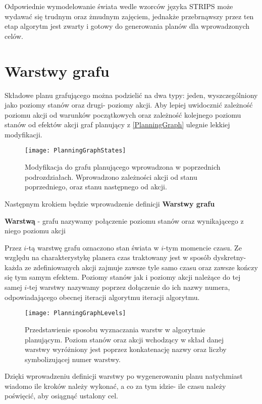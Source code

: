     
    Odpowiednie wymodelowanie świata wedle wzorców języka STRIPS może wydawać się trudnym oraz żmudnym zajęciem, jednakże przebrnąwszy 
    przez ten etap algorytm jest zwarty i gotowy do generowania planów dla wprowadzonych celów.


\section{Warstwy grafu}
    Składowe planu grafującego można podzielić na dwa typy: jeden, wyszczególniony jako poziomy stanów oraz drugi- poziomy akcji. Aby lepiej 
    uwidocznić zależność poziomu akcji od warunków początkowych oraz zależność kolejnego poziomu stanów od efektów akcji graf planujący 
    z \ref{PlanningGraph} ulegnie lekkiej modyfikacji. 
    \begin{figure}[H]
        \texttt{[image: PlanningGraphStates]}
        \centering
        \caption{Modyfikacja do grafu planującego wprowadzona w poprzednich podrozdziałach. Wprowadzono zależności akcji od stanu poprzedniego, oraz stanu 
        następnego od akcji.}
        \label{PlanningGraphStates}
    \end{figure}
    Następnym krokiem będzie wprowadzenie definicji \textbf{Warstwy grafu}
    \begin{definition}
        \label{Warstwa}
        \textbf{Warstwą} - grafu nazywamy połączenie poziomu stanów oraz wynikającego z niego poziomu akcji
    \end{definition}
    Przez $i$-tą warstwę grafu oznaczono stan świata w $i$-tym momencie czasu. Ze względu na charakterystykę planera czas traktowany jest w sposób dyskretny-
    każda ze zdefiniowanych akcji zajmuje zawsze tyle samo czasu oraz zawsze kończy się tym samym efektem. Poziomy stanów jak i poziomy akcji 
    należące do tej samej $i$-tej warstwy nazywamy poprzez dołączenie do ich nazwy numera, odpowiadającego obecnej iteracji algorytmu
    iteracji algorytmu.
    \begin{figure}[H]
        \texttt{[image: PlanningGraphLevels]}
        \centering
        \caption{Przedstawienie sposobu wyznaczania warstw w algorytmie planującym. Poziom stanów oraz akcji wchodzący w skład danej warstwy 
        wyróżniony jest poprzez konkatenację nazwy oraz liczby symbolizującej numer warstwy.}
        \label{PlanningGraphLevels}
    \end{figure}
    Dzięki wprowadzeniu definicji warstwy po wygenerowaniu 
    planu natychmiast wiadomo ile kroków należy wykonać, a co za tym idzie- ile czasu należy poświęcić, aby osiągnąć ustalony cel. 

